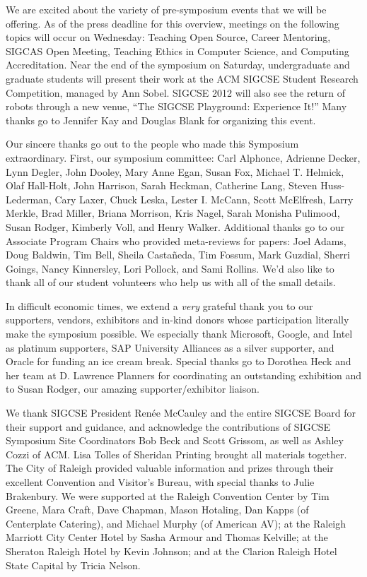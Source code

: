 We are excited about the variety of pre-symposium events that we will be offering. As of the press deadline for this overview, meetings on the following topics will occur on Wednesday: Teaching Open Source, Career Mentoring, SIGCAS Open Meeting, Teaching Ethics in Computer Science, and Computing Accreditation. Near the end of the symposium on Saturday, undergraduate and graduate students will present their work at the ACM SIGCSE Student Research Competition, managed by Ann Sobel. SIGCSE 2012 will also see the return of robots through a new venue, “The SIGCSE Playground: Experience It!” Many thanks go to Jennifer Kay and Douglas Blank for organizing this event. 
\vspace{0.5\baselineskip}

Our sincere thanks go out to the people who made this Symposium extraordinary. First, our symposium committee: Carl Alphonce, Adrienne Decker, Lynn Degler, John Dooley, Mary Anne Egan, Susan Fox, Michael T. Helmick, Olaf Hall-Holt, John Harrison, Sarah Heckman, Catherine Lang, Steven Huss-Lederman, Cary Laxer, Chuck Leska, Lester I. McCann, Scott McElfresh, Larry Merkle, Brad Miller, Briana Morrison, Kris Nagel, Sarah Monisha Pulimood, Susan Rodger, Kimberly Voll, and Henry Walker. Additional thanks go to our Associate Program Chairs who provided meta-reviews for papers: Joel Adams, Doug Baldwin, Tim Bell, Sheila Castañeda, Tim Fossum, Mark Guzdial, Sherri Goings, Nancy Kinnersley, Lori Pollock, and Sami Rollins. We’d also like to thank all of our student volunteers who help us with all of the small details.
\vspace{0.5\baselineskip}

In difficult economic times, we extend a \textit{very} grateful thank you to our supporters, vendors, exhibitors and in-kind donors whose participation literally make the symposium possible. We especially thank Microsoft, Google, and Intel as platinum supporters, SAP University Alliances as a silver supporter, and Oracle for funding an ice cream break. Special thanks go to Dorothea Heck and her team at D. Lawrence Planners for coordinating an outstanding exhibition and to Susan Rodger, our amazing supporter/exhibitor liaison.
\vspace{0.5\baselineskip}

We thank SIGCSE President Renée McCauley and the entire SIGCSE Board for their support and guidance, and acknowledge the contributions of SIGCSE Symposium Site Coordinators Bob Beck and Scott Grissom, as well as Ashley Cozzi of ACM. Lisa Tolles of Sheridan Printing brought all materials together. The City of Raleigh provided valuable information and prizes through their excellent Convention and Visitor’s Bureau, with special thanks to Julie Brakenbury. We were supported at the Raleigh Convention Center by Tim Greene, Mara Craft, Dave Chapman, Mason Hotaling, Dan Kapps (of Centerplate Catering), and Michael Murphy (of American AV); at the Raleigh Marriott City Center Hotel by Sasha Armour and Thomas Kelville; at the Sheraton Raleigh Hotel by Kevin Johnson; and at the Clarion Raleigh Hotel State Capital by Tricia Nelson.
\vspace{0.5\baselineskip}

